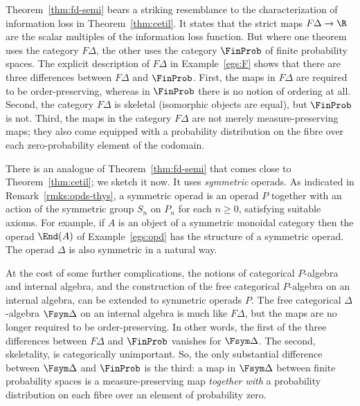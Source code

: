 Theorem~\ref{thm:fd-semi} bears a striking resemblance to the
characterization of information loss in Theorem~\ref{thm:cetil}.  It states
that the strict maps $F\Delta \to \R$ are the scalar multiples of the
information loss function.  But where one theorem uses the category
$F\Delta$, the other uses the category $\FinProb$ of finite probability
spaces. The explicit description of $F\Delta$ in
Example~\ref{egs:F} shows that there are three differences
between $F\Delta$ and $\FinProb$. First, the maps in $F\Delta$ are required
to be order-preserving,%
%
%
% 
whereas in $\FinProb$ there is no notion of ordering at all.  Second, the
category $F\Delta$ is skeletal (isomorphic objects are equal), but
$\FinProb$ is not.  Third, the maps in the category $F\Delta$ are not
merely measure-preserving maps; they also come equipped with a probability
distribution on the fibre over each zero-probability element of the codomain.

There is an analogue of Theorem~\ref{thm:fd-semi} that comes close to
Theorem~\ref{thm:cetil}; we sketch it now. It uses \emph{symmetric}%
%
%
% 
operads. As indicated in
Remark~\ref{rmks:opds-thys}, a symmetric operad is
an operad $P$ together with an action of the symmetric group $S_n$ on $P_n$
for each $n \geq 0$, satisfying suitable axioms.  For example, if $A$ is
an object of a symmetric monoidal category then the operad $\End(A)$
of Example~\ref{egs:opd} has the structure of a symmetric
operad.  The operad $\Delta$ is also symmetric in a natural way.

At the cost of some further complications, the notions of categorical
$P$-algebra and internal algebra, and the construction of the free
categorical $P$-algebra on an internal algebra, can be extended to
symmetric operads $P$.  The free categorical $\Delta$-algebra $\Fsym
\Delta$ on an internal algebra is much like $F\Delta$, but the maps are no
longer required to be order-preserving.  In other words, the first of the
three differences between $F\Delta$ and $\FinProb$ vanishes for
$\Fsym\Delta$.  The second, skeletality, is categorically unimportant.  So,
the only substantial difference between $\Fsym\Delta$ and $\FinProb$ is the
third: a map in $\Fsym\Delta$ between finite probability spaces is a
measure-preserving map \emph{together with} a probability distribution on
each fibre over an element of probability zero.

